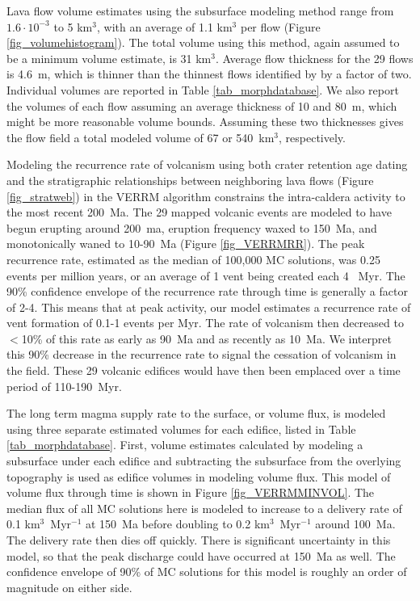 Lava flow volume estimates using the subsurface modeling method range from $1.6\cdot 10^{-3}$ to 5 km$^3$, with an average of 1.1 km$^3$ per flow (Figure \ref{fig_volumehistogram}). The total volume using this method, again assumed to be a minimum volume estimate, is 31 km$^3$. Average flow thickness for the 29 flows is 4.6~m, which is thinner than the thinnest flows identified by \citet{mouginis2008lava} by a factor of two. Individual volumes are reported in Table \ref{tab_morphdatabase}. We also report the volumes of each flow assuming an average thickness of 10 and 80~m, which might be more reasonable volume bounds. Assuming these two thicknesses gives the flow field a total modeled volume of 67 or 540~km$^3$, respectively.

Modeling the recurrence rate of volcanism using both crater retention age dating and the stratigraphic relationships between neighboring lava flows (Figure \ref{fig_stratweb}) in the VERRM algorithm constrains the intra-caldera activity to the most recent 200~Ma. The 29 mapped volcanic events are modeled to have begun erupting around 200~ma, eruption frequency waxed to 150~Ma, and monotonically waned to 10-90~Ma (Figure \ref{fig_VERRMRR}). The peak recurrence rate, estimated as the median of 100,000 MC solutions, was 0.25 events per million years, or an average of 1 vent being created each 4 ~Myr. The 90\% confidence envelope of the recurrence rate through time is generally a factor of 2-4. This means that at peak activity, our model estimates a recurrence rate of vent formation of 0.1-1 events per Myr. The rate of volcanism then decreased to $<$10\% of this rate as early as 90~Ma and  as recently as 10~Ma. We interpret this 90\% decrease in the recurrence rate to signal the cessation of volcanism in the field. These 29 volcanic edifices would have then been emplaced over a time period of 110-190~Myr.

The long term magma supply rate to the surface, or volume flux, is modeled using three separate estimated volumes for each edifice, listed in Table \ref{tab_morphdatabase}. First, volume estimates calculated by modeling a subsurface under each edifice and subtracting the subsurface from the overlying topography is used as edifice volumes in modeling volume flux. This model of volume flux through time is shown in Figure \ref{fig_VERRMMINVOL}. The median flux of all MC solutions here is modeled to increase to a delivery rate of 0.1 km$^3$~Myr$^{-1}$ at 150~Ma before doubling to 0.2 km$^3$~Myr$^{-1}$ around 100~Ma. The delivery rate then dies off quickly. There is significant uncertainty in this model, so that the peak discharge could have occurred at 150~Ma as well. The confidence envelope of 90\% of MC solutions for this model is roughly an order of magnitude on either side.

